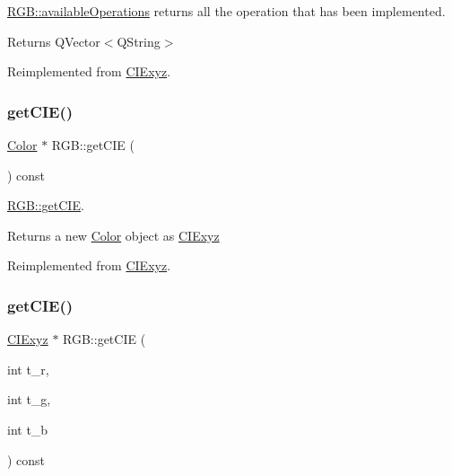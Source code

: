 \hyperlink{class_r_g_b_a6cde5a9d00036c76fef2dd51ca8256a4}{R\+G\+B\+::available\+Operations} returns all the operation that has been implemented. 

\begin{DoxyReturn}{Returns}
Q\+Vector$<$\+Q\+String$>$ 
\end{DoxyReturn}


Reimplemented from \hyperlink{class_c_i_exyz_aa82a27c78ff425e06cdd740dd50e93b1}{C\+I\+Exyz}.

\mbox{\label{class_r_g_b_ac4b085d5587c664f7f9ceae1eb857d24}} 
\subsubsection{\texorpdfstring{get\+C\+I\+E()}{getCIE()}\hspace{0.1cm}{\footnotesize\ttfamily [1/2]}}
{\footnotesize\ttfamily \hyperlink{class_color}{Color} $\ast$ R\+G\+B\+::get\+C\+IE (\begin{DoxyParamCaption}{ }\end{DoxyParamCaption}) const\hspace{0.3cm}{\ttfamily [virtual]}}



\hyperlink{class_r_g_b_ac4b085d5587c664f7f9ceae1eb857d24}{R\+G\+B\+::get\+C\+IE}. 

\begin{DoxyReturn}{Returns}
a new \hyperlink{class_color}{Color} object as \hyperlink{class_c_i_exyz}{C\+I\+Exyz} 
\end{DoxyReturn}


Reimplemented from \hyperlink{class_c_i_exyz_aa93c7a293b63c7bce8d1fab9a185ab1b}{C\+I\+Exyz}.

\mbox{\label{class_r_g_b_a153f315167dfd89944c625d43b307b43}} 
\subsubsection{\texorpdfstring{get\+C\+I\+E()}{getCIE()}\hspace{0.1cm}{\footnotesize\ttfamily [2/2]}}
{\footnotesize\ttfamily \hyperlink{class_c_i_exyz}{C\+I\+Exyz} $\ast$ R\+G\+B\+::get\+C\+IE (\begin{DoxyParamCaption}\item[{int}]{t\+\_\+r,  }\item[{int}]{t\+\_\+g,  }\item[{int}]{t\+\_\+b }\end{DoxyParamCaption}) const}



